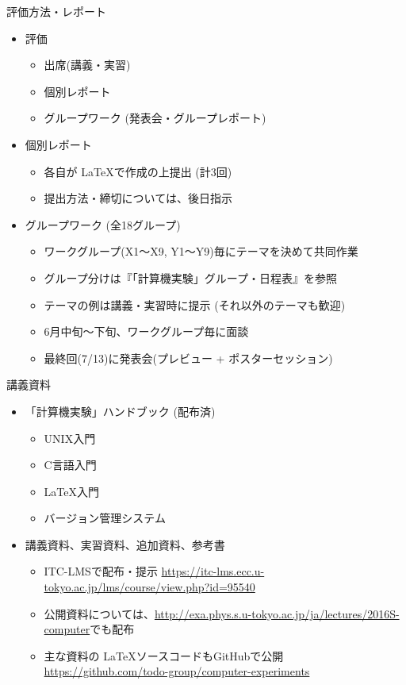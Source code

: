 \documentclass[dvipdfmx]{beamer}
\begin{document}
\begin{frame}[t,fragile]{評価方法・レポート}
  \begin{itemize}
  \item 評価
    \begin{itemize}
    \item 出席(講義・実習)
    \item 個別レポート
    \item グループワーク (発表会・グループレポート)
    \end{itemize}    
  \item 個別レポート
    \begin{itemize}
    \item 各自が \LaTeX で作成の上提出 (計3回)
    \item 提出方法・締切については、後日指示
    \end{itemize}
  \item グループワーク (全18グループ)
    \begin{itemize}
    \item ワークグループ(X1〜X9, Y1〜Y9)毎にテーマを決めて共同作業
    \item グループ分けは『「計算機実験」グループ・日程表』を参照
    \item テーマの例は講義・実習時に提示 (それ以外のテーマも歓迎)
    \item 6月中旬〜下旬、ワークグループ毎に面談
    \item 最終回(7/13)に発表会(プレビュー + ポスターセッション)
    \end{itemize}
  \end{itemize}    
\end{frame}

\begin{frame}[t]{講義資料}
  \begin{itemize}
    \setlength{\itemsep}{1em}
  \item 「計算機実験」ハンドブック (配布済)
    \begin{itemize}
    \item UNIX入門
    \item C言語入門
    \item \LaTeX 入門
    \item バージョン管理システム
    \end{itemize}
  \item 講義資料、実習資料、追加資料、参考書
    \begin{itemize}
    \item ITC-LMSで配布・提示 \url{https://itc-lms.ecc.u-tokyo.ac.jp/lms/course/view.php?id=95540}
    \item 公開資料については、\url{http://exa.phys.s.u-tokyo.ac.jp/ja/lectures/2016S-computer}でも配布
    \item 主な資料の \LaTeX ソースコードもGitHubで公開 \\
    {\footnotesize \url{https://github.com/todo-group/computer-experiments}}
    \end{itemize}
  \end{itemize}
\end{frame}
\end{document}
